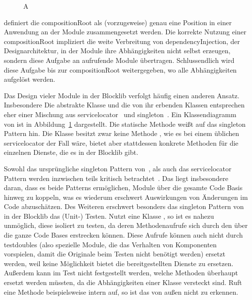 \begin{figure}
  \begin{center}
    
  \end{center}
  \caption{A}\label{fig:diagContext}
\end{figure}
\textcite[S.~76]{Seemann2012} definiert die \gls{compositionRoot} als (vorzugsweise) genau eine Position in einer Anwendung an der Module zusammengesetzt werden. Die korrekte Nutzung einer \gls{compositionRoot} impliziert die weite Verbreitung von \gls{dependencyInjection}, der Designarchitektur, in der Module ihre Abhängigkeiten nicht selbst erzeugen, sondern diese Aufgabe an aufrufende Module übertragen. Schlussendlich wird diese Aufgabe bis zur \gls{compositionRoot} weitergegeben, wo alle Abhängigkeiten aufgelöst werden. 


Das Design vieler Module in der Blocklib verfolgt häufig einen anderen Ansatz. Insbesondere Die abstrakte Klasse  und die von ihr erbenden Klassen entsprechen eher einer Mischung aus \gls{servicelocator}~\cite[S.~301~ff.]{Nystrom2015} und \gls{singleton}~\cite[S.~103~ff.]{Nystrom2015}. Ein Klassendiagramm von  ist in Abbildung~\ref{fig:diagContext} dargestellt. Die statische Methode  weißt auf das \gls{singleton} Pattern hin. Die Klasse besitzt zwar keine Methode , wie es bei einem üblichen \gls{servicelocator} der Fall wäre, bietet aber stattdessen konkrete Methoden für die einzelnen Dienste, die es in der Blocklib gibt.

Sowohl das ursprüngliche \gls{singleton} Pattern von~\textcite[S.~127~ff.]{Gamma2016}, als auch das \gls{servicelocator} Pattern werden inzwischen teils kritisch betrachtet~\cite[S.~103~ff.]{Nystrom2015}\cite[S.~154~ff.]{Seemann2012}. Das liegt insbesondere daran, dass es beide Patterns ermöglichen, Module über die gesamte Code Basis hinweg zu koppeln, was es wiederum erschwert Auswirkungen von Änderungen im Code abzuschätzen. Des Weiteren erschwert besonders das \gls{singleton} Pattern von  in der Blocklib das (Unit-) Testen. Nutzt eine Klasse , so ist es nahezu unmöglich, diese isoliert zu testen, da deren Methodenaufrufe sich durch den  über die ganze Code Bases erstrecken können. Diese  Aufrufe können auch nicht durch \glspl{testdouble} (also spezielle Module, die das Verhalten von Komponenten vorspielen, damit die Originale beim Testen nicht benötigt werden) ersetzt werden, weil  keine Möglichkeit bietet die bereitgestellten Dienste zu ersetzen. Außerdem kann im Test nicht festgestellt werden, welche Methoden überhaupt ersetzt werden müssten, da die Abhängigkeiten einer Klasse versteckt sind. Ruft eine Methode beispielsweise intern  auf, so ist das von außen nicht zu erkennen.

